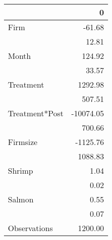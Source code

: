 \begin{tabular}{lr}
\toprule
{} &         0 \\
\midrule
Firm           &    -61.68 \\
               &     12.81 \\
Month          &    124.92 \\
               &     33.57 \\
Treatment      &   1292.98 \\
               &    507.51 \\
Treatment*Post & -10074.05 \\
               &    700.66 \\
Firmsize       &  -1125.76 \\
               &   1088.83 \\
Shrimp         &      1.04 \\
               &      0.02 \\
Salmon         &      0.55 \\
               &      0.07 \\
Observations   &   1200.00 \\
\bottomrule
\end{tabular}
